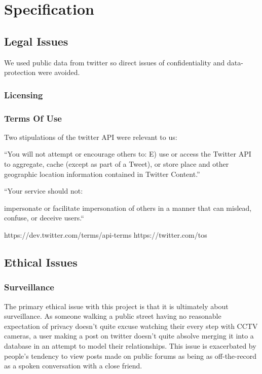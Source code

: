 \chapter{Specification}

\section{Legal Issues}

We used public data from twitter so direct issues of confidentiality and data-protection were avoided.

\subsection{Licensing}



\subsection{Terms Of Use}

Two stipulations of the twitter API were relevant to us:

“You will not attempt or encourage others to: E) use or access the Twitter API to aggregate, cache (except as part of a Tweet), or store place and other geographic location information contained in Twitter Content.”

“Your service should not:

    impersonate or facilitate impersonation of others in a manner that can mislead, confuse, or deceive users.“

https://dev.twitter.com/terms/api-terms
https://twitter.com/tos

\section{Ethical Issues}

\subsection{Surveillance}
The primary ethical issue with this project is that it is ultimately about surveillance. As someone walking a public street having no reasonable expectation of privacy doesn’t quite excuse watching their every step with CCTV cameras, a user making a post on twitter doesn’t quite absolve merging it into a database in an attempt to model their relationships. This issue is exacerbated by people’s tendency to view posts made on public forums as being as off-the-record as a spoken conversation with a close friend.

